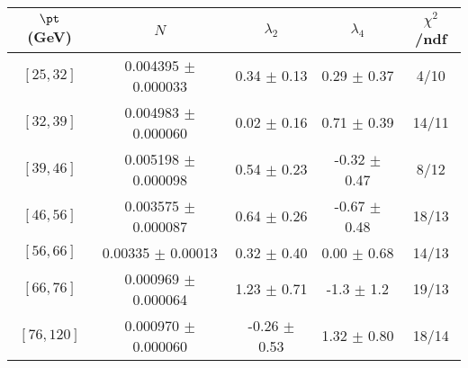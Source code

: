 \begin{tabular}{c||c|c|c|c}
$\pt$ (GeV) & $N$ & $\lambda_{2}$ & $\lambda_4$  & $\chi^2$/ndf  \\
\hline
$[25, 32]$ & 0.004395 $\pm$ 0.000033 & 0.34 $\pm$ 0.13 & 0.29 $\pm$ 0.37 & 4/10\\
$[32, 39]$ & 0.004983 $\pm$ 0.000060 & 0.02 $\pm$ 0.16 & 0.71 $\pm$ 0.39 & 14/11\\
$[39, 46]$ & 0.005198 $\pm$ 0.000098 & 0.54 $\pm$ 0.23 & -0.32 $\pm$ 0.47 & 8/12\\
$[46, 56]$ & 0.003575 $\pm$ 0.000087 & 0.64 $\pm$ 0.26 & -0.67 $\pm$ 0.48 & 18/13\\
$[56, 66]$ & 0.00335 $\pm$ 0.00013 & 0.32 $\pm$ 0.40 & 0.00 $\pm$ 0.68 & 14/13\\
$[66, 76]$ & 0.000969 $\pm$ 0.000064 & 1.23 $\pm$ 0.71 & -1.3 $\pm$ 1.2 & 19/13\\
$[76, 120]$ & 0.000970 $\pm$ 0.000060 & -0.26 $\pm$ 0.53 & 1.32 $\pm$ 0.80 & 18/14\\
\end{tabular}
